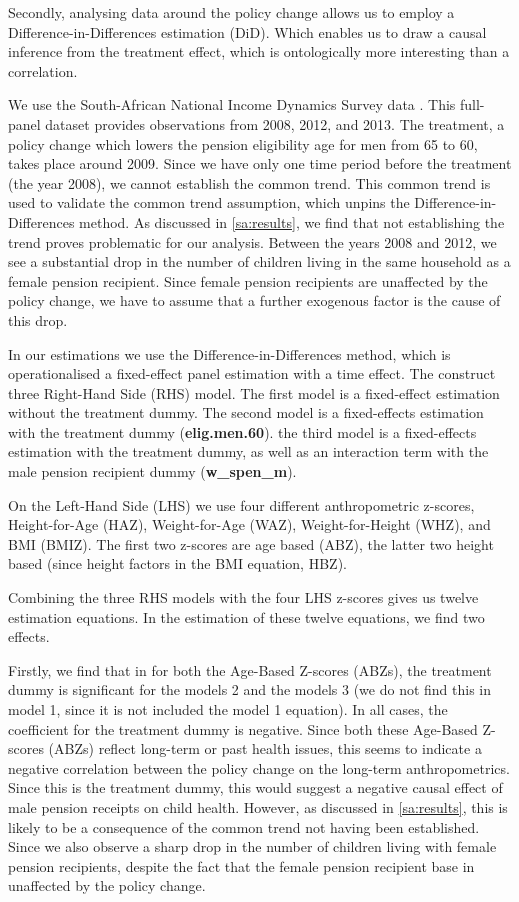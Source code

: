 \begin{refsection}
Secondly, analysing data around the policy change allows us to employ a Difference-in-Differences estimation (DiD).
Which enables us to draw a causal inference from the treatment effect,
which is ontologically more interesting than a correlation.

We use the South-African National Income Dynamics Survey data
\parencite[in collaboration with The World Bank]{saldru2008nids,saldru2012nids,saldru2013nids}.
This full-panel dataset provides observations from 2008, 2012, and 2013.
The treatment, a policy change which lowers the pension eligibility age for men from 65 to 60, takes place around 2009.
Since we have only one time period before the treatment (the year 2008), we cannot establish the common trend.
This common trend is used to validate the common trend assumption, which unpins the Difference-in-Differences method.
As discussed in \autoref{sa:results}, we find that not establishing the trend proves problematic for our analysis.
Between the years 2008 and 2012,
we see a substantial drop in the number of children living in the same household as a female pension recipient.
Since female pension recipients are unaffected by the policy change, we have to assume that a further exogenous factor is the cause of this drop.

In our estimations we use the Difference-in-Differences method,
which is operationalised a fixed-effect panel estimation with a time effect.
The construct three Right-Hand Side (RHS) model.
The first model is a fixed-effect estimation without the treatment dummy.
The second model is a fixed-effects estimation with the treatment dummy (\textbf{elig.men.60}).
the third model is a fixed-effects estimation with the treatment dummy,
as well as an interaction term with the male pension recipient dummy (\textbf{w\_spen\_m}).

On the Left-Hand Side (LHS) we use four different anthropometric z-scores,
Height-for-Age (HAZ), Weight-for-Age (WAZ), Weight-for-Height (WHZ), and BMI (BMIZ).
The first two z-scores are age based (ABZ), the latter two height based (since height factors in the BMI equation, HBZ).

Combining the three RHS models with the four LHS z-scores gives us twelve estimation equations.
In the estimation of these twelve equations, we find two effects.

Firstly, we find that in for both the Age-Based Z-scores (ABZs),
the treatment dummy is significant for the models 2 and the models 3
(we do not find this in model 1, since it is not included the model 1 equation).
In all cases, the coefficient for the treatment dummy is negative.
Since both these Age-Based Z-scores (ABZs) reflect long-term or past health issues,
this seems to indicate a negative correlation between the policy change on the long-term anthropometrics.
Since this is the treatment dummy, this would suggest a negative causal effect of male pension receipts on child health.
However, as discussed in \autoref{sa:results},
this is likely to be a consequence of the common trend not having been established.
Since we also observe a sharp drop in the number of children living with female pension recipients,
despite the fact that the female pension recipient base in unaffected by the policy change.


\end{refsection}
